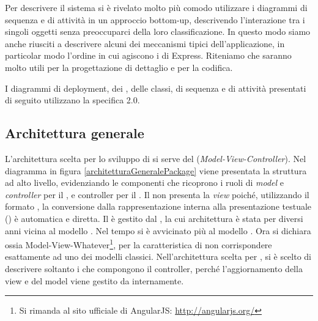 Per descrivere il sistema si è rivelato molto più comodo utilizzare i diagrammi di sequenza e di attività in un approccio bottom-up, descrivendo l'interazione tra i singoli oggetti senza preoccuparci della loro classificazione. In questo modo siamo anche riusciti a descrivere alcuni dei meccanismi tipici dell'applicazione, in particolar modo l'ordine in cui agiscono i  di Express. Riteniamo che saranno molto utili per la progettazione di dettaglio e per la codifica.

I diagrammi di deployment, dei , delle classi, di sequenza e di attività presentati di seguito utilizzano la specifica  2.0.

\subsection{Architettura generale}

L'architettura scelta per lo sviluppo di \ProjectName{} si serve del   (\textit{Model-View-Controller}). Nel diagramma in figura \ref{architetturaGeneralePackage} viene presentata la struttura ad alto livello, evidenziando le componenti che ricoprono i ruoli di \textit{model} e \textit{controller} per il , e controller per il . Il  non presenta la \textit{view} poiché, utilizzando il formato , la conversione dalla rappresentazione interna alla presentazione testuale () è automatica e diretta.
Il  è gestito dal  , la cui architettura è stata per diversi anni vicina al modello . Nel tempo si è avvicinato più al modello . Ora  si dichiara  ossia Model-View-Whatever\footnote{Si rimanda al sito ufficiale di AngularJS: \url{http://angularjs.org/}}, per la caratteristica di non corrispondere esattamente ad uno dei modelli classici. Nell'architettura scelta per \ProjectName{}, si è scelto di descrivere soltanto i  che compongono il controller, perché l'aggiornamento della view e del model viene gestito da  internamente.


